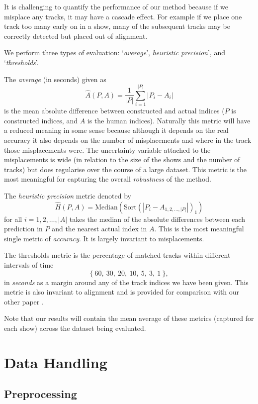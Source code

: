 \documentclass[twocolumn]{article}
\begin{document}
	It is challenging to quantify the performance of our method because if we misplace any tracks, it may have a cascade effect. For example if we place one track too many early on in a show, many of the subsequent tracks may be correctly detected but placed out of alignment. 
	
	We perform three types of evaluation: `\textit{average}', \textit{heuristic precision}', and `\textit{thresholds}'.
	
	The \textit{average} (in seconds) given as $$\hat A(P,A) = \frac{1}{|P|}\sum_{i=1}^{|P|}{|P_i-A_i|}$$ is the mean absolute difference between constructed and actual indices ($P$ is constructed indices, and $A$ is the human indices). Naturally this metric will have a reduced meaning in some sense because although it depends on the real accuracy it also depends on the number of misplacements and where in the track those misplacements were. The uncertainty variable attached to the misplacements is wide (in relation to the size of the shows and the number of tracks) but does regularise over the course of a large dataset. This metric is the most meaningful for capturing the overall \textit{robustness} of the method.
	
	The \textit{heuristic precision} metric denoted by 
	\[
	\hat H(P,A) =  \mathrm{Median}\left(    \mathrm{Sort}\left( |P_i-A_{1,2,\ldots,|P|}|\right)_1 \right)
	\] for all $i=1,2,\ldots,|A|$
	takes the median of the absolute differences between each prediction in $P$ and the nearest actual index in $A$. This is the most meaningful single metric of \textit{accuracy}. It is largely invariant to misplacements.
	
	The thresholds metric is the percentage of matched tracks within different intervals of time \[\{~60, ~30, ~20, ~10, ~5, ~3, ~1~\},\] in \emph{seconds} as a margin around any of the track indices we have been given. This metric is also invariant to alignment and is provided for comparison with our other paper \cite{scarfe2013long}.
	
	Note that our results will contain the mean average of these metrics (captured for each show) across the dataset being evaluated. 
	
	\section{Data Handling}
	
	\subsection{Preprocessing}\label{proprocessing} %
	
\end{document}
